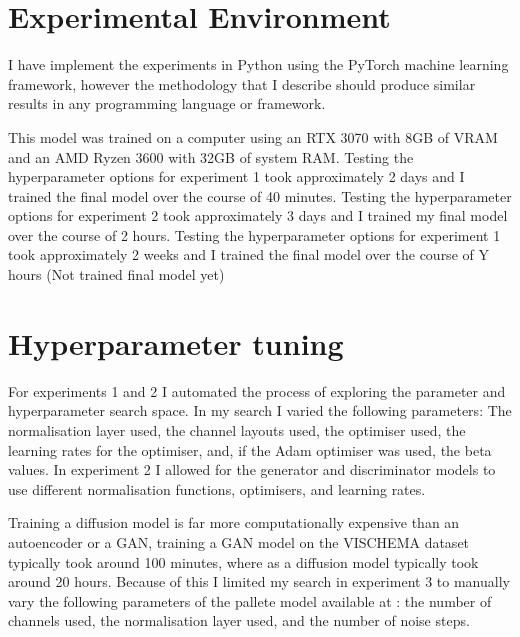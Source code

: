 \documentclass{UoYCSproject}
\begin{document}


\section{Experimental Environment}

I have implement the experiments in Python using the PyTorch machine learning framework, however the methodology that I describe should produce similar results in any programming language or framework.

This model was trained on a computer using an RTX 3070 with 8GB of VRAM and an AMD Ryzen 3600 with 32GB of system RAM.
Testing the hyperparameter options for experiment 1 took approximately 2 days and I trained the final model over the course of 40 minutes.
Testing the hyperparameter options for experiment 2 took approximately 3 days and I trained my final model over the course of 2 hours.  
Testing the hyperparameter options for experiment 1 took approximately 2 weeks and I trained the final model over the course of Y hours (Not trained final model yet)

\section{Hyperparameter tuning}

For experiments 1 and 2 I automated the process of exploring the parameter and hyperparameter search space. In my search I varied the following parameters: The normalisation layer used, the channel layouts used, the optimiser used, the learning rates for the optimiser, and, if the Adam optimiser was used, the beta values. In experiment 2 I allowed for the generator and discriminator models to use different normalisation functions, optimisers, and learning rates. 


Training a diffusion model is far more computationally expensive than an autoencoder or a GAN, training a GAN model on the VISCHEMA dataset typically took around 100 minutes, where as a diffusion model typically took around 20 hours. 
Because of this I limited my search in experiment 3 to manually vary the following parameters of the pallete model available at \cite{JanspiryPalette}: the number of channels used, the normalisation layer used, and the number of noise steps.
\end{document}
